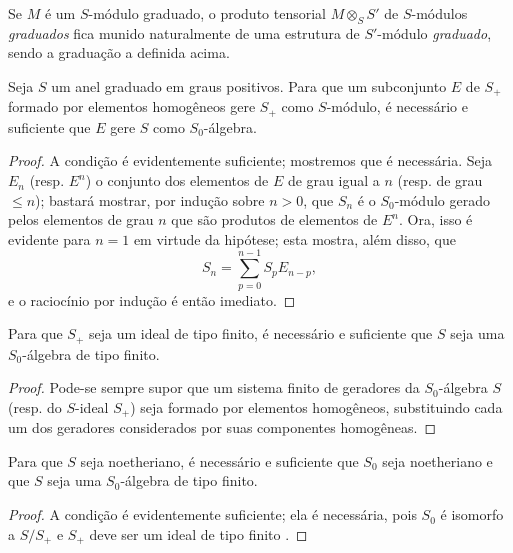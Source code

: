 \documentclass[oneside,10pt]{amsart}
\renewcommand{\leq}{\leqslant}
\let\EGAOriginalLabel\label
\renewcommand{\label}[1]{\phantomsection\EGAOriginalLabel{#1}}
\begin{document}
\begin{env}[2.1.2]
Se $M$ é um $S$-módulo graduado, o produto tensorial $M\otimes_S S'$ de $S$-módulos \emph{graduados} fica munido naturalmente de uma estrutura de $S'$-módulo \emph{graduado}, sendo a graduação a definida acima.
\end{env}

\begin{lemma}[2.1.3]
\label{II.2.1.3}
Seja $S$ um anel graduado em graus positivos.
Para que um subconjunto $E$ de $S_+$ formado por elementos homogêneos gere $S_+$ como $S$-módulo, é necessário e suficiente que $E$ gere $S$ como $S_0$-álgebra.
\end{lemma}

\begin{proof}
A condição é evidentemente suficiente; mostremos que é necessária.
Seja $E_n$ (resp. $E^n$) o conjunto dos elementos de $E$ de grau igual a $n$ (resp. de grau $\leq n$); bastará mostrar, por indução sobre $n>0$, que $S_n$ é o $S_0$-módulo gerado pelos elementos de grau $n$ que são produtos de elementos de $E^n$.
Ora, isso é evidente para $n=1$ em virtude da hipótese; esta mostra, além disso, que
\[
  S_n=\sum_{p=0}^{n-1}S_pE_{n-p},
\]
e o raciocínio por indução é então imediato.
\end{proof}

\begin{corollary}[2.1.4]
\label{II.2.1.4}
Para que $S_+$ seja um ideal de tipo finito, é necessário e suficiente que $S$ seja uma $S_0$-álgebra de tipo finito.
\end{corollary}

\begin{proof}
Pode-se sempre supor que um sistema finito de geradores da $S_0$-álgebra $S$ (resp. do $S$-ideal $S_+$) seja formado por elementos homogêneos, substituindo cada um dos geradores considerados por suas componentes homogêneas.
\end{proof}

\begin{corollary}[2.1.5]
\label{II.2.1.5}
Para que $S$ seja noetheriano, é necessário e suficiente que $S_0$ seja noetheriano e que $S$ seja uma $S_0$-álgebra de tipo finito.
\end{corollary}

\begin{proof}
A condição é evidentemente suficiente; ela é necessária, pois $S_0$ é isomorfo a $S/S_+$ e $S_+$ deve ser um ideal de tipo finito .
\end{proof}
\end{document}
